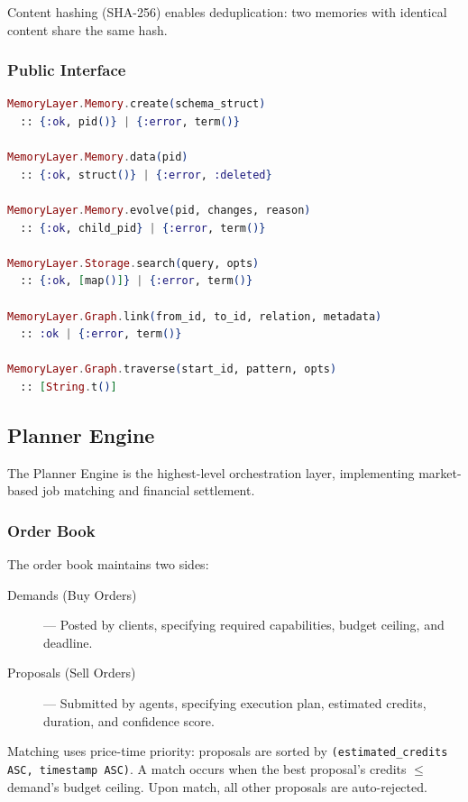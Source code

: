 \documentclass[12pt,a4paper]{article}
\theoremstyle{definition}
\begin{document}
Content hashing (SHA-256) enables deduplication: two memories with
identical content share the same hash.

\subsubsection{Public Interface}

\begin{lstlisting}[language=elixir, caption={Memory Layer public API}]
MemoryLayer.Memory.create(schema_struct)
  :: {:ok, pid()} | {:error, term()}

MemoryLayer.Memory.data(pid)
  :: {:ok, struct()} | {:error, :deleted}

MemoryLayer.Memory.evolve(pid, changes, reason)
  :: {:ok, child_pid} | {:error, term()}

MemoryLayer.Storage.search(query, opts)
  :: {:ok, [map()]} | {:error, term()}

MemoryLayer.Graph.link(from_id, to_id, relation, metadata)
  :: :ok | {:error, term()}

MemoryLayer.Graph.traverse(start_id, pattern, opts)
  :: [String.t()]
\end{lstlisting}

\subsection{Planner Engine}\label{subsec:planner}

The Planner Engine is the highest-level orchestration layer, implementing
market-based job matching and financial settlement.

\subsubsection{Order Book}

The order book maintains two sides:

\begin{description}
  \item[Demands (Buy Orders)] --- Posted by clients, specifying required
    capabilities, budget ceiling, and deadline.
  \item[Proposals (Sell Orders)] --- Submitted by agents, specifying
    execution plan, estimated credits, duration, and confidence score.
\end{description}

Matching uses price-time priority: proposals are sorted by
\texttt{(estimated\_credits ASC, timestamp ASC)}. A match occurs when the
best proposal's credits $\leq$ demand's budget ceiling. Upon match, all
other proposals are auto-rejected.
\end{document}
